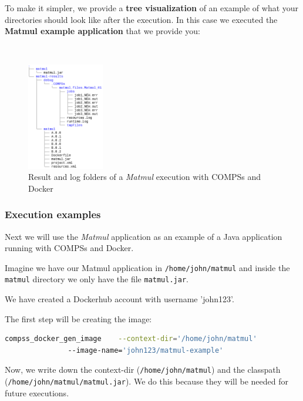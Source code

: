 To make it simpler, we provide a \textbf{tree visualization} of an example of what your directories should look like after the execution.
In this case we executed the \textbf{Matmul example application} that we provide you:

~ \newline

\begin{figure}[!ht]
  \centering
    \includegraphics[width=0.3\textwidth]{./Sections/5_Execution_Platforms/Figures/docker-matmul-results-tree.png}
    \caption{Result and log folders of a \textit{Matmul} execution with COMPSs and Docker}
    \label{fig:compss_docker_results}
\end{figure}


\clearpage
\subsubsection{Execution examples}

  Next we will use the \textit{Matmul} application as an example of a Java application running with COMPSs and Docker.

Imagine we have our Matmul application in \texttt{/home/john/matmul} and inside the \texttt{matmul} directory we only have the file \texttt{matmul.jar}.

We have created a Dockerhub account with username 'john123'.

The first step will be creating the image:
\begin{lstlisting}[language=bash]
compss_docker_gen_image    --context-dir='/home/john/matmul'
			   --image-name='john123/matmul-example'
\end{lstlisting}

Now, we write down the context-dir (\texttt{/home/john/matmul}) and the classpath \\ (\texttt{/home/john/matmul/matmul.jar}). We do this because they will be needed for future executions. \\

